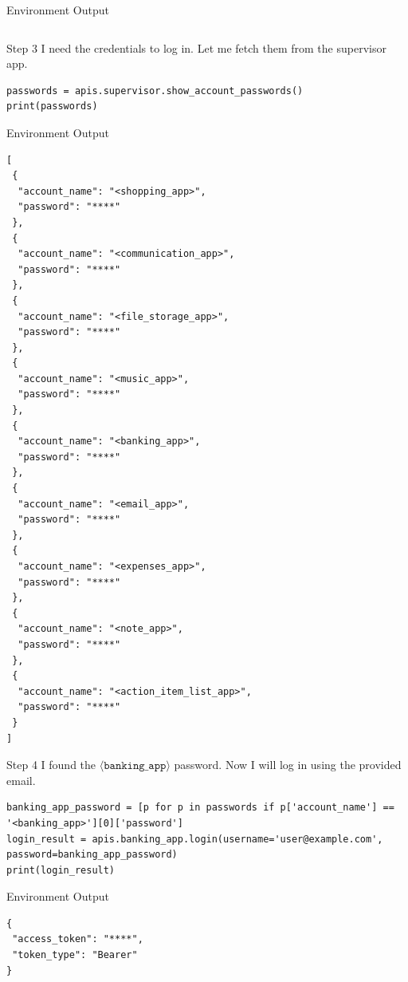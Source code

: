 \begin{center}
\begin{envbox}{Environment Output}
\begin{Verbatim}[fontsize=\scriptsize, breaklines, breakanywhere]
\end{Verbatim}
\end{envbox}

\begin{agentbox}{Step 3}
I need the credentials to log in. Let me fetch them from the supervisor app.
\begin{Verbatim}[fontsize=\scriptsize, breaklines, breakanywhere]
passwords = apis.supervisor.show_account_passwords()
print(passwords)
\end{Verbatim}
\end{agentbox}
\begin{envbox}{Environment Output}
\begin{Verbatim}[fontsize=\scriptsize, breaklines, breakanywhere]
[
 {
  "account_name": "<shopping_app>",
  "password": "****"
 },
 {
  "account_name": "<communication_app>",
  "password": "****"
 },
 {
  "account_name": "<file_storage_app>",
  "password": "****"
 },
 {
  "account_name": "<music_app>",
  "password": "****"
 },
 {
  "account_name": "<banking_app>",
  "password": "****"
 },
 {
  "account_name": "<email_app>",
  "password": "****"
 },
 {
  "account_name": "<expenses_app>",
  "password": "****"
 },
 {
  "account_name": "<note_app>",
  "password": "****"
 },
 {
  "account_name": "<action_item_list_app>",
  "password": "****"
 }
]

\end{Verbatim}
\end{envbox}

\begin{agentbox}{Step 4}
I found the $\langle\mathtt{banking\_app}\rangle$ password. Now I will log in using the provided email.
\begin{Verbatim}[fontsize=\scriptsize, breaklines, breakanywhere]
banking_app_password = [p for p in passwords if p['account_name'] == '<banking_app>'][0]['password']
login_result = apis.banking_app.login(username='user@example.com', password=banking_app_password)
print(login_result)
\end{Verbatim}
\end{agentbox}
\begin{envbox}{Environment Output}
\begin{Verbatim}[fontsize=\scriptsize, breaklines, breakanywhere]
{
 "access_token": "****",
 "token_type": "Bearer"
}

\end{Verbatim}
\end{envbox}


\end{center}
